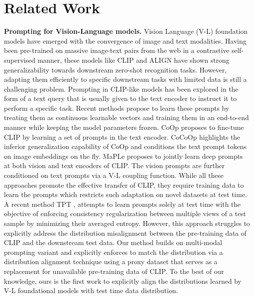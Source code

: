 \documentclass[a4paper]{article}
\begin{document}
\section{Related Work}
\noindent
\textbf{Prompting for Vision-Language models.}
Vision Language (V-L) foundation models \cite{radford2021learning, jia2021scaling, zhai2022lit, yao2021filip, yuan2021florence} have emerged with the convergence of image and text modalities. Having been pre-trained on massive image-text pairs from the web in a contrastive self-supervised manner, these models like CLIP \cite{radford2021learning} and ALIGN \cite{jia2021scaling} have shown strong generalizability towards downstream zero-shot recognition tasks. However, adapting them efficiently to specific downstream tasks with limited data is still a challenging problem. Prompting in CLIP-like models has been explored in the form of a text query that is usually given to the text encoder to instruct it to perform a specific task. Recent methods propose to learn these prompts by treating them as continuous learnable vectors and training them in an end-to-end manner while keeping the model parameters frozen. CoOp \cite{zhou2022coop} proposes to fine-tune CLIP by learning a set of prompts in the text encoder. CoCoOp \cite{zhou2022cocoop} highlights the inferior generalization capability of CoOp and conditions the text prompt tokens on image embeddings on the fly. MaPLe \cite{khattakMaPLe} proposes to jointly learn deep prompts at both vision and text encoders of CLIP. The vision prompts are further conditioned on text prompts via a V-L coupling function. While all these approaches promote the effective transfer of CLIP, they require training data to learn the prompts which restricts such adaptation on novel datasets at test time. A recent method TPT \cite{shu2022test}, attempts to learn prompts solely at test time with the objective of enforcing consistency regularization between multiple views of a test sample by minimizing their averaged entropy. However, this approach struggles to explicitly address the distribution misalignment between the pre-training data of CLIP and the downstream test data. Our method builds on multi-modal prompting variant \cite{khattakMaPLe} and explicitly enforces to match the distribution via a distribution alignment technique using a proxy dataset that serves as a replacement for unavailable pre-training data of CLIP. To the best of our knowledge, ours is the first work to explicitly align the distributions learned by V-L foundational models with test time data distribution.
\end{document}
